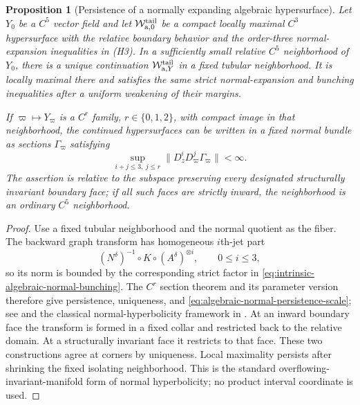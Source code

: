 \documentclass[11pt]{amsart}
\numberwithin{equation}{section}
\newtheorem{proposition}[theorem]{Proposition}
\theoremstyle{definition}
\theoremstyle{remark}
\begin{document}
\begin{proposition}[Persistence of a normally expanding algebraic
hypersurface]
\label{prop:algebraic-normal-persistence}
Let $Y_0$ be a $C^5$ vector field and let
$\mathcal W^{\rm tail}_{\mathrm a,0}$ be a compact locally maximal
$C^3$ hypersurface with the relative boundary behavior and the
order-three normal-expansion inequalities in \textup{(H3)}.  In a
sufficiently small relative $C^5$ neighborhood of $Y_0$, there is a
unique continuation $\mathcal W^{\rm tail}_{\mathrm a,Y}$ in a fixed
tubular neighborhood.  It is locally maximal there and satisfies the same
strict normal-expansion and bunching inequalities after a uniform
weakening of their margins.

If $\varpi\mapsto Y_\varpi$ is a $C^r$ family, $r\in\{0,1,2\}$, with
compact image in that neighborhood, the continued hypersurfaces can be
written in a fixed normal bundle as sections $\Gamma_\varpi$ satisfying
\begin{equation}\label{eq:algebraic-normal-persistence-scale}
 \sup_{i+j\le3,\ j\le r}
 \|D_z^iD_\varpi^j\Gamma_\varpi\|<\infty.
\end{equation}
The assertion is relative to the subspace preserving every designated
structurally invariant boundary face; if all such faces are strictly
inward, the neighborhood is an ordinary $C^5$ neighborhood.
\end{proposition}

\begin{proof}
Use a fixed tubular neighborhood and the normal quotient as the fiber.
The backward graph transform has homogeneous $i$th-jet part
\[
 (N^\delta)^{-1}\circ K\circ(A^\delta)^{\otimes i},
 \qquad 0\le i\le3,
\]
so its norm is bounded by the corresponding strict factor in
\eqref{eq:intrinsic-algebraic-normal-bunching}.  The $C^r$ section theorem
and its parameter version therefore give persistence, uniqueness, and
\eqref{eq:algebraic-normal-persistence-scale}; see
\cite[Chapter~3]{HirschPughShub1977InvariantManifolds} and the classical
normal-hyperbolicity framework in \cite{Fenichel1971Persistence}.  At an inward
boundary face the transform is formed in a fixed collar and restricted
back to the relative domain.  At a structurally invariant face it
restricts to that face.  These two constructions agree at corners by
uniqueness.  Local maximality persists after shrinking the fixed isolating
neighborhood.  This is the standard overflowing-invariant-manifold form
of normal hyperbolicity; no product interval coordinate is used.
\end{proof}
\end{document}
